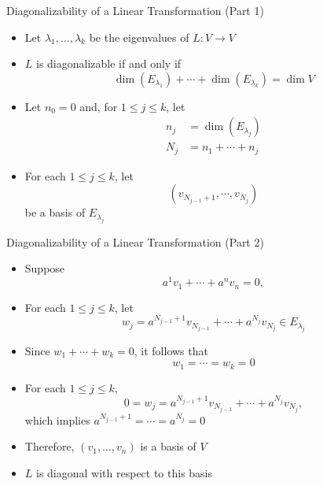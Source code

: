 \documentclass[usenames,dvipsnames,10pt]{beamer}
\begin{document}
\begin{frame}
  {Diagonalizability of a Linear Transformation (Part 1)}

  \begin{itemize}
  \item Let $\lambda_1, \dots, \lambda_k$ be the eigenvalues of $L: V\rightarrow V$
  \item $L$ is diagonalizable if and only if
    \[ \dim(E_{\lambda_1}) + \cdots + \dim(E_{\lambda_k}) = \dim V \]
  \item Let $n_0 = 0$ and, for $1 \le j \le k$, let
    \begin{align*}
      n_j &= \dim(E_{\lambda_j})\\
      N_j &= n_1 + \cdots + n_{j}
    \end{align*}
  \item For each $1 \le j \le k$, let
    \[
      (v_{N_{j-1}+1}, \cdots, v_{N_j})
    \]
    be a basis of $E_{\lambda_j}$
  \end{itemize}
\end{frame}

\begin{frame}
  {Diagonalizability of a Linear Transformation (Part 2)}

  \begin{itemize}
  \item Suppose
    \[
      a^1v_1 + \cdots + a^nv_n = 0,
    \]
  \item For each $1 \le j \le k$, let
    \[
      w_j = a^{N_{j-1}+1}v_{N_{j-1}}+ \cdots+ a^{N_j}v_{N_j} \in E_{\lambda_j}
    \]
  \item Since $w_1+\cdots+w_k = 0$, it follows that
    \[
      w_1 = \cdots = w_k = 0
    \]
  \item For each $1 \le j \le k$,
    \[ 0 = w_j = a^{N_{j-1}+1}v_{N_{j-1}}+ \cdots+ a^{N_j}v_{N_j}, \]
    which implies $a^{N_{j-1}+1}= \cdots=a^{N_j}=0$
  \item Therefore, $(v_1, \dots, v_n)$ is a basis of $V$
  \item $L$ is diagonal with respect to this basis
  \end{itemize}
\end{frame}
\end{document}
